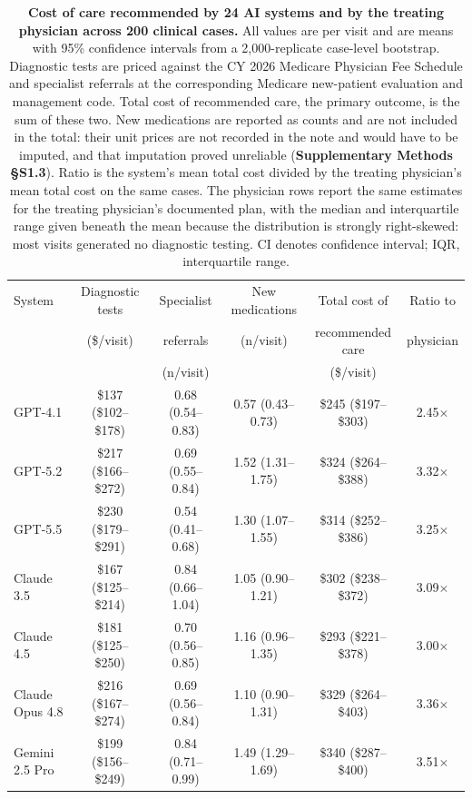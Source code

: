 \begin{table}[h!]
\centering
\footnotesize
\caption{\textbf{Cost of care recommended by 24 AI systems and by the treating physician across 200 clinical cases.} All values are per visit and are means with 95\% confidence intervals from a 2,000-replicate case-level bootstrap. Diagnostic tests are priced against the CY 2026 Medicare Physician Fee Schedule and specialist referrals at the corresponding Medicare new-patient evaluation and management code. Total cost of recommended care, the primary outcome, is the sum of these two. New medications are reported as counts and are not included in the total: their unit prices are not recorded in the note and would have to be imputed, and that imputation proved unreliable (\textbf{Supplementary Methods \S S1.3}). Ratio is the system's mean total cost divided by the treating physician's mean total cost on the same cases. The physician rows report the same estimates for the treating physician's documented plan, with the median and interquartile range given beneath the mean because the distribution is strongly right-skewed: most visits generated no diagnostic testing. CI denotes confidence interval; IQR, interquartile range.}
\label{tab:cost}
\begin{tabular}{l c c c c c}
\toprule
System & Diagnostic tests & Specialist & New medications & Total cost of & Ratio to \\
 & (\$/visit) & referrals & (n/visit) & recommended care & physician \\
 & & (n/visit) & & (\$/visit) & \\
\midrule
GPT-4.1 & \$137 (\$102--\$178) & 0.68 (0.54--0.83) & 0.57 (0.43--0.73) & \$245 (\$197--\$303) & 2.45$\times$ \\
GPT-5.2 & \$217 (\$166--\$272) & 0.69 (0.55--0.84) & 1.52 (1.31--1.75) & \$324 (\$264--\$388) & 3.32$\times$ \\
GPT-5.5 & \$230 (\$179--\$291) & 0.54 (0.41--0.68) & 1.30 (1.07--1.55) & \$314 (\$252--\$386) & 3.25$\times$ \\
Claude 3.5 & \$167 (\$125--\$214) & 0.84 (0.66--1.04) & 1.05 (0.90--1.21) & \$302 (\$238--\$372) & 3.09$\times$ \\
Claude 4.5 & \$181 (\$125--\$250) & 0.70 (0.56--0.85) & 1.16 (0.96--1.35) & \$293 (\$221--\$378) & 3.00$\times$ \\
Claude Opus 4.8 & \$216 (\$167--\$274) & 0.69 (0.56--0.84) & 1.10 (0.90--1.31) & \$329 (\$264--\$403) & 3.36$\times$ \\
Gemini 2.5 Pro & \$199 (\$156--\$249) & 0.84 (0.71--0.99) & 1.49 (1.29--1.69) & \$340 (\$287--\$400) & 3.51$\times$ \\

\end{tabular}
\end{table}
